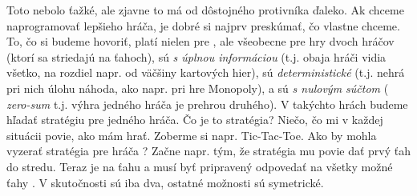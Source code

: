 Toto nebolo ťažké, ale zjavne to má 
od dôstojného protivníka ďaleko.
Ak chceme naprogramovať lepšieho hráča, je dobré si najprv preskúmať, čo vlastne chceme. To, čo si budeme hovoriť, platí nielen pre \btr, ale všeobecne pre hry dvoch hráčov (ktorí sa striedajú na ťahoch),
sú {\em s úplnou informáciou} 
(t.j. obaja hráči vidia všetko, na rozdiel napr. od väčšiny kartových hier), 
sú {\em deterministické} (t.j. nehrá pri nich úlohu náhoda, ako napr. pri hre Monopoly), 
a sú {\em s nulovým súčtom} ( {\em zero-sum}
t.j. výhra jedného hráča je prehrou druhého). V takýchto hrách budeme hľadať 
stratégiu pre jedného hráča. Čo je to stratégia? Niečo, čo mi v každej situácii povie, ako mám hrať.
Zoberme si napr. Tic-Tac-Toe. Ako by mohla vyzerať stratégia pre hráča \hbox{\crossinl?}
Začne napr. tým, že stratégia mu povie dať prvý ťah do stredu. Teraz je na ťahu \noughtinl a \crossinl musí byť
pripravený odpovedať na všetky možné ťahy \noughtinl. 
V skutočnosti sú iba dva, ostatné možnosti sú symetrické.\\


